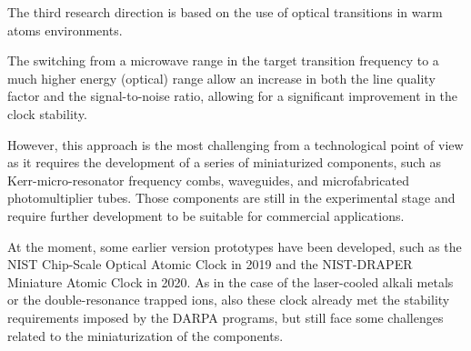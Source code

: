 The third research direction is based on the use of optical transitions in warm atoms environments.

The switching from a microwave range in the target transition frequency to a much higher energy (optical) range allow an increase in both the line quality factor and the signal-to-noise ratio, allowing for a significant improvement in the clock stability.

However, this approach is the most challenging from a technological point of view as it requires the development of a series of miniaturized components, such as Kerr-micro-resonator frequency combs, waveguides, and microfabricated photomultiplier tubes.
Those components are still in the experimental stage and require further development to be suitable for commercial applications.

At the moment, some earlier version prototypes have been developed, such as the NIST Chip-Scale Optical Atomic Clock in 2019 and the NIST-DRAPER Miniature Atomic Clock in 2020.
As in the case of the laser-cooled alkali metals or the double-resonance trapped ions, also these clock already met the stability requirements imposed by the DARPA programs, but still face some challenges related to the miniaturization of the components.


